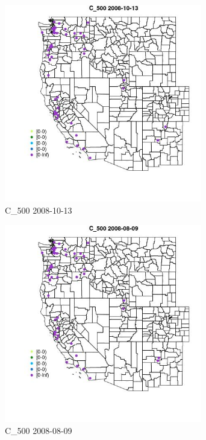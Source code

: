 \begin{figure} 
\centering  
\includegraphics[width=0.77\textwidth]{Code_Outputs/Report_ML_input_PM25_Step4_part_e_de_duplicated_aves_MapObsC_5002008-10-13.jpg} 
\caption{\label{fig:Report_ML_input_PM25_Step4_part_e_de_duplicated_avesMapObsC_5002008-10-13}C_500 2008-10-13} 
\end{figure} 
 

\begin{figure} 
\centering  
\includegraphics[width=0.77\textwidth]{Code_Outputs/Report_ML_input_PM25_Step4_part_e_de_duplicated_aves_MapObsC_5002008-08-09.jpg} 
\caption{\label{fig:Report_ML_input_PM25_Step4_part_e_de_duplicated_avesMapObsC_5002008-08-09}C_500 2008-08-09} 
\end{figure} 
 

